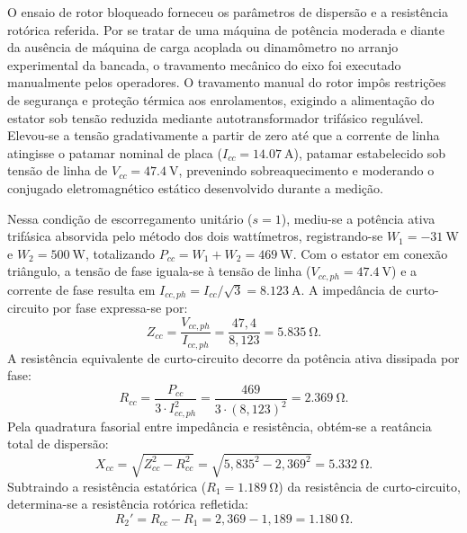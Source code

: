 O ensaio de rotor bloqueado forneceu os parâmetros de dispersão e a resistência rotórica referida. Por se tratar de uma máquina de potência moderada e diante da ausência de máquina de carga acoplada ou dinamômetro no arranjo experimental da bancada, o travamento mecânico do eixo foi executado manualmente pelos operadores. O travamento manual do rotor impôs restrições de segurança e proteção térmica aos enrolamentos, exigindo a alimentação do estator sob tensão reduzida mediante autotransformador trifásico regulável. Elevou-se a tensão gradativamente a partir de zero até que a corrente de linha atingisse o patamar nominal de placa ($I_{cc} = \SI{14,07}{\ampere}$), patamar estabelecido sob tensão de linha de $V_{cc} = \SI{47,4}{\volt}$, prevenindo sobreaquecimento e moderando o conjugado eletromagnético estático desenvolvido durante a medição.

Nessa condição de escorregamento unitário ($s = 1$), mediu-se a potência ativa trifásica absorvida pelo método dos dois wattímetros, registrando-se $W_1 = \SI{-31}{\watt}$ e $W_2 = \SI{500}{\watt}$, totalizando $P_{cc} = W_1 + W_2 = \SI{469}{\watt}$. Com o estator em conexão triângulo, a tensão de fase iguala-se à tensão de linha ($V_{cc,ph} = \SI{47,4}{\volt}$) e a corrente de fase resulta em $I_{cc,ph} = I_{cc} / \sqrt{3} = \SI{8,123}{\ampere}$. A impedância de curto-circuito por fase expressa-se por:
\begin{equation}
Z_{cc} = \frac{V_{cc,ph}}{I_{cc,ph}} = \frac{47{,}4}{8{,}123} = \SI{5,835}{\ohm}.
\label{eq:zcc_calculada}
\end{equation}
A resistência equivalente de curto-circuito decorre da potência ativa dissipada por fase:
\begin{equation}
R_{cc} = \frac{P_{cc}}{3 \cdot I_{cc,ph}^2} = \frac{469}{3 \cdot (8{,}123)^2} = \SI{2,369}{\ohm}.
\label{eq:rcc_calculada}
\end{equation}
Pela quadratura fasorial entre impedância e resistência, obtém-se a reatância total de dispersão:
\begin{equation}
X_{cc} = \sqrt{Z_{cc}^2 - R_{cc}^2} = \sqrt{5{,}835^2 - 2{,}369^2} = \SI{5,332}{\ohm}.
\label{eq:xcc_calculada}
\end{equation}
Subtraindo a resistência estatórica ($R_1 = \SI{1,189}{\ohm}$) da resistência de curto-circuito, determina-se a resistência rotórica refletida:
\begin{equation}
R_2' = R_{cc} - R_1 = 2{,}369 - 1{,}189 = \SI{1,180}{\ohm}.
\label{eq:r2_calculada}
\end{equation}

